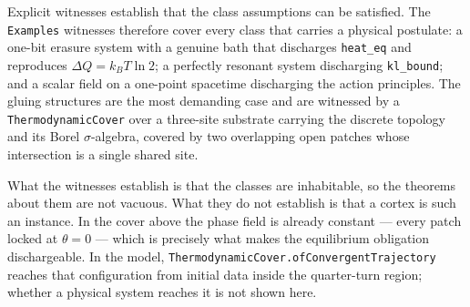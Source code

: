\documentclass{article}
\begin{document}
Explicit witnesses establish that the class assumptions can be satisfied. The \texttt{Examples} witnesses therefore cover every class that carries a physical postulate: a one-bit erasure system with a genuine bath that discharges \nolinkurl{heat_eq} and reproduces $\Delta Q = k_B T \ln 2$; a perfectly resonant system discharging \nolinkurl{kl_bound}; and a scalar field on a one-point spacetime discharging the action principles. The gluing structures are the most demanding case and are witnessed by a \texttt{ThermodynamicCover} over a three-site substrate carrying the discrete topology and its Borel $\sigma$-algebra, covered by two overlapping open patches whose intersection is a single shared site.

What the witnesses establish is that the classes are inhabitable, so the theorems about them are not vacuous. What they do not establish is that a cortex is such an instance. In the cover above the phase field is already constant --- every patch locked at $\theta = 0$ --- which is precisely what makes the equilibrium obligation dischargeable. In the model, \nolinkurl{ThermodynamicCover.ofConvergentTrajectory} reaches that configuration from initial data inside the quarter-turn region; whether a physical system reaches it is not shown here.


\end{document}
